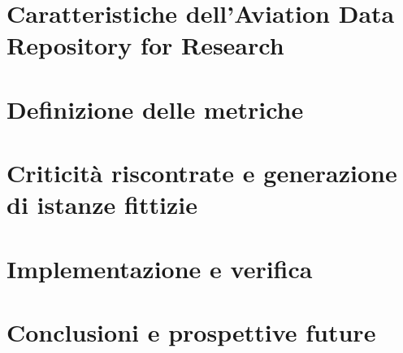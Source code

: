 \documentclass[a4paper,11pt,twoside,texglossaries,palatino]{resources/thesis}
\begin{document}
    \chapter{Caratteristiche dell'Aviation Data Repository for Research}
    
    \cleardoublepage
    \chapter{Definizione delle metriche}
    
    \cleardoublepage
    \chapter{Criticità riscontrate e generazione di istanze fittizie}
    
    \cleardoublepage
    \chapter{Implementazione e verifica}
    
    \cleardoublepage
    \chapter{Conclusioni e prospettive future}
    
    \cleardoublepage
    \printnoidxglossary[type=\acronymtype, title=Acronimi]
    \cleardoublepage
    \printnoidxglossary[type=main, title=Glossario]

    
\end{document}
